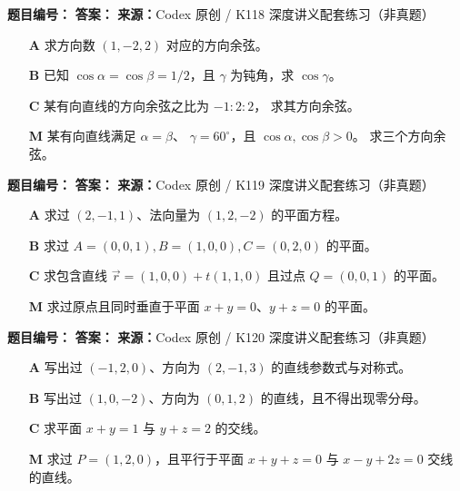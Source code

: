 \begin{problemBox}
\begin{problemMeta}
\textbf{题目编号：} \quad
\textbf{答案：} \quad
\textbf{来源：}Codex 原创 / K118 深度讲义配套练习（非真题）
\end{problemMeta}
\begin{enumerate}
  \item[\textbf{A}] 求方向数 \((1,-2,2)\) 对应的方向余弦。
  \item[\textbf{B}] 已知 \(\cos\alpha=\cos\beta=1/2\)，且
  \(\gamma\) 为钝角，求 \(\cos\gamma\)。
  \item[\textbf{C}] 某有向直线的方向余弦之比为 \(-1:2:2\)，
  求其方向余弦。
  \item[\textbf{M}] 某有向直线满足 \(\alpha=\beta\)、
  \(\gamma=60^\circ\)，且 \(\cos\alpha,\cos\beta>0\)。
  求三个方向余弦。
\end{enumerate}
\end{problemBox}

\begin{problemBox}
\begin{problemMeta}
\textbf{题目编号：} \quad
\textbf{答案：} \quad
\textbf{来源：}Codex 原创 / K119 深度讲义配套练习（非真题）
\end{problemMeta}
\begin{enumerate}
  \item[\textbf{A}] 求过 \((2,-1,1)\)、法向量为 \((1,2,-2)\)
  的平面方程。
  \item[\textbf{B}] 求过
  \(A=(0,0,1),B=(1,0,0),C=(0,2,0)\) 的平面。
  \item[\textbf{C}] 求包含直线
  \(\vec r=(1,0,0)+t(1,1,0)\) 且过点 \(Q=(0,0,1)\) 的平面。
  \item[\textbf{M}] 求过原点且同时垂直于平面
  \(x+y=0\)、\(y+z=0\) 的平面。
\end{enumerate}
\end{problemBox}

\begin{problemBox}
\begin{problemMeta}
\textbf{题目编号：} \quad
\textbf{答案：} \quad
\textbf{来源：}Codex 原创 / K120 深度讲义配套练习（非真题）
\end{problemMeta}
\begin{enumerate}
  \item[\textbf{A}] 写出过 \((-1,2,0)\)、方向为 \((2,-1,3)\)
  的直线参数式与对称式。
  \item[\textbf{B}] 写出过 \((1,0,-2)\)、方向为 \((0,1,2)\)
  的直线，且不得出现零分母。
  \item[\textbf{C}] 求平面 \(x+y=1\) 与 \(y+z=2\) 的交线。
  \item[\textbf{M}] 求过 \(P=(1,2,0)\)，且平行于平面
  \(x+y+z=0\) 与 \(x-y+2z=0\) 交线的直线。
\end{enumerate}
\end{problemBox}

